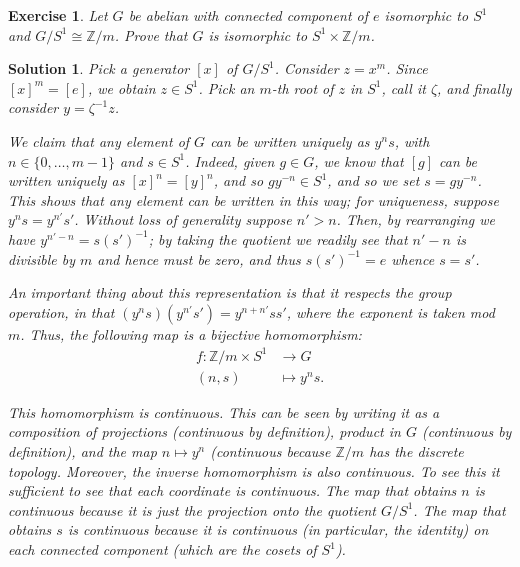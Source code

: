 \documentclass{article}
\newtheorem{ex}{Exercise}
\theoremstyle{nonumberplain}
\newtheorem{sol}{Solution}
\newcommand{\Z}{\mathbb{Z}}
\begin{document}
\begin{ex}
Let $G$ be abelian with connected component of $e$ isomorphic to $S^1$ and $G/S^1 \cong \Z/m$. Prove that $G$ is isomorphic to $S^1 \times \Z/m$.
\end{ex}

\begin{sol}
Pick a generator $[x]$ of $G/S^1$. Consider $z = x^m$. Since $[x]^m = [e]$, we obtain $z \in S^1$. Pick an $m$-th root of $z$ in $S^1$, call it $\zeta$, and finally consider $y = \zeta^{-1} z$.

We claim that any element of $G$ can be written uniquely as $y^n s$, with $n \in \{0, \dots, m-1\}$ and $s \in S^1$. Indeed, given $g \in G$, we know that $[g]$ can be written uniquely as $[x]^n = [y]^n$, and so $g y^{-n} \in S^1$, and so we set $s = g y^{-n}$. This shows that any element can be written in this way; for uniqueness, suppose $y^n s = y^{n'} s'$. Without loss of generality suppose $n' > n$. Then, by rearranging we have $y^{n'-n} = s (s')^{-1}$; by taking the quotient we readily see that $n'-n$ is divisible by $m$ and hence must be zero, and thus $s (s')^{-1} = e$ whence $s = s'$.

An important thing about this representation is that it respects the group operation, in that $(y^n s) (y^{n'} s') = y^{n+n'} s s'$, where the exponent is taken mod $m$. Thus, the following map is a bijective homomorphism:
\begin{equation}
\begin{aligned}
f \colon \Z/m \times S^1 &\to G\\
(n,s) &\mapsto y^n s.
\end{aligned}
\end{equation}

This homomorphism is continuous. This can be seen by writing it as a composition of projections (continuous by definition), product in $G$ (continuous by definition), and the map $n \mapsto y^n$ (continuous because $\Z/m$ has the discrete topology. Moreover, the inverse homomorphism is also continuous. To see this it sufficient to see that each coordinate is continuous. The map that obtains $n$ is continuous because it is just the projection onto the quotient $G/S^1$. The map that obtains $s$ is continuous because it is continuous (in particular, the identity) on each connected component (which are the cosets of $S^1$).
\end{sol}
\end{document}
